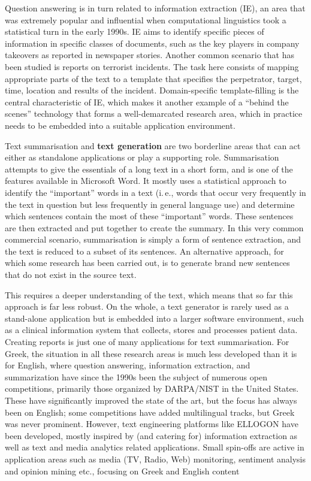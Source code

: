 \documentclass[]{../../metanetpaper}
\begin{document}
\begin{multicols}{2}
Question answering is in turn related to information extraction (IE), an area that was extremely popular and influential when computational linguistics took a statistical turn in the early 1990s. IE aims to identify specific pieces of information in specific classes of documents, such as the key players in company takeovers as reported in newspaper stories. Another common scenario that has been studied is reports on terrorist incidents. The task here consists of mapping appropriate parts of the text to a template that specifies the perpetrator, target, time, location and results of the incident. Domain-specific template-filling is the central characteristic of IE, which makes it another example of a “behind the scenes” technology that forms a well-demarcated research area, which in practice needs to be embedded into a suitable application environment. 

Text summarisation and \textbf{text generation} are two borderline areas that can act either as standalone applications or play a supporting role. Summarisation attempts to give the essentials of a long text in a short form, and is one of the features available in Microsoft Word. It mostly uses a statistical approach to identify the “important” words in a text (i.\,e., words that occur very frequently in the text in question but less frequently in general language use) and determine which sentences contain the most of these “important” words. These sentences are then extracted and put together to create the summary. In this very common commercial scenario, summarisation is simply a form of sentence extraction, and the text is reduced to a subset of its sentences. An alternative approach, for which some research has been carried out, is to generate brand new sentences that do not exist in the source text. 


This requires a deeper understanding of the text, which means that so far this approach is far less robust. On the whole, a text generator is rarely used as a stand-alone application but is embedded into a larger software environment, such as a clinical information system that collects, stores and processes patient data. Creating reports is just one of many applications for text summarisation. 
For Greek, the situation in all these research areas is much less developed than it is for English, where question answering, information extraction, and summarization have since the 1990s been the subject of numerous open competitions, primarily those organized by DARPA/NIST in the United States. These have significantly improved the state of the art, but the focus has always been on English; some competitions have added multilingual tracks, but Greek was never prominent. However, text engineering platforms like ELLOGON have been developed, mostly inspired by (and catering for) information extraction as well as text and media analytics related applications. Small spin-offs are active in application areas such as media (TV, Radio, Web) monitoring, sentiment analysis and opinion mining etc., focusing on Greek and English content


\end{multicols}
\end{document}
